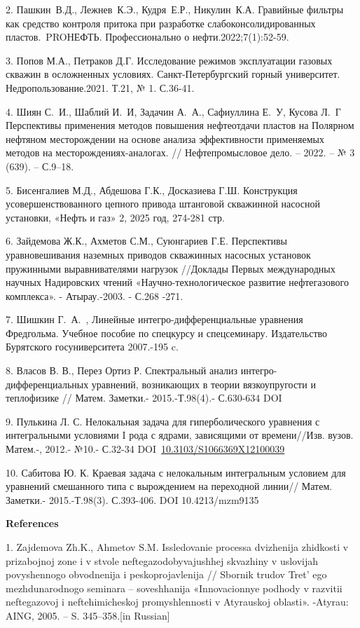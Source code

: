 2. Пашкин~В.Д., Лежнев~К.Э., Кудря~Е.Р., Никулин~К.А. Гравийные фильтры
как средство контроля притока при разработке слабоконсолидированных
пластов.~PROНЕФТЬ. Профессионально о нефти.2022;7(1):52-59.~

3. Попов М.А., Петраков Д.Г. Исследование режимов эксплуатации газовых
скважин в осложненных условиях. Санкт-Петербургский горный университет.
Недропользование.2021. Т.21, № 1. С.36-41.

4. Шиян С.~И., Шаблий И.~И, Задачин А.~А., Сафиуллина Е.~У, Кусова Л.~Г
Перспективы применения методов повышения нефтеотдачи пластов на Полярном
нефтяном месторождении на основе анализа эффективности применяемых
методов на месторождениях-аналогах. // Нефтепромысловое дело. -- 2022.
-- № 3 (639). -- С.9--18.

5. Бисенгалиев М.Д., Абдешова Г.К., Досказиева Г.Ш. Конструкция
усовершенствованного цепного привода штанговой скважинной насосной
установки, «Нефть и газ» 2, 2025 год, 274-281 стр.

6. Зайдемова Ж.К., Ахметов С.М., Суюнгариев Г.Е. Перспективы
уравновешивания наземных приводов скважинных насосных установок
пружинными выравнивателями нагрузок //Доклады Первых международных
научных Надировских чтений «Научно-технологическое развитие
нефтегазового комплекса». - Атырау.-2003. - С.268 -271.

7. Шишкин Г.~А.~, Линейные интегро-дифференциальные уравнения
Фредгольма. Учебное пособие по спецкурсу и спецсеминару. Издательство
Бурятского госуниверситета 2007.-195 c.

8. Власов В. В., Перез Ортиз Р. Спектральный анализ
интегро-дифференциальных уравнений, возникающих в теории вязкоупругости
и теплофизике // Матем. Заметки.- 2015.-Т.98(4).- С.630-634
DOI~\href{https://doi.org/10.4213/mzm10829}{}

9. Пулькина Л. С. Нелокальная задача для гиперболического уравнения с
интегральными условиями I рода с ядрами, зависящими от времени//Изв.
вузов. Матем.-, 2012.- №10.- С.32-34
DOI~\href{https://doi.org/10.3103/S1066369X12100039}{10.3103/S1066369X12100039}

10. Сабитова Ю. К. Краевая задача с нелокальным интегральным условием
для уравнений смешанного типа с вырождением на переходной линии// Матем.
Заметки.- 2015.-Т.98(3). С.393-406. DOI 10.4213/mzm9135

{\bfseries References}

1. Zajdemova Zh.K., Ahmetov S.M. Issledovanie processa dvizhenija
zhidkosti v prizabojnoj zone i v stvole neftegazodobyvajushhej skvazhiny
v uslovijah povyshennogo obvodnenija i peskoprojavlenija // Sbornik
trudov Tret' ego mezhdunarodnogo seminara -- soveshhanija
«Innovacionnye podhody v razvitii neftegazovoj i neftehimicheskoj
promyshlennosti v Atyrauskoj oblasti». -Atyrau: AING, 2005. -- S.
345--358.{[}in Russian{]}


